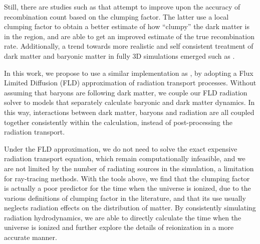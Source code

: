 Still, there are studies such as \citep{PawlikEtAl2009, RaicevicTheuns2011} 
that attempt to improve upon the accuracy of recombination count based on the clumping
factor.  The latter use a local clumping factor to obtain a better estimate
of how ``clumpy'' the dark matter is in the region, and are able to
get an improved estimate of the true recombination rate.  Additionally, a trend towards
more realistic and self consistent treatment of dark matter and
baryonic matter in fully 3D simulations emerged such as \citep{PetkovaSpringel2011a, 
PetkovaSpringel2011b}. 


In this work, we propose to use a similar implementation as 
\citealt{PetkovaSpringel2011b}, by adopting a Flux Limited Diffusion
(FLD) approximation of radiation transport processes.  Without 
assuming that baryons are following dark matter, we couple our FLD
radiation solver to models that separately calculate baryonic and dark
matter dynamics.  In this way, interactions between dark matter,
baryons and radiation are all coupled together consistently
within the calculation, instead of post-processing the radiation transport.

Under the FLD approximation, we do not need to solve the exact
expensive radiation transport equation, which remain computationally
infeasible, and we are not limited by the number of radiating sources
in the simulation, a limitation for ray-tracing methods.  With the
tools above, we find that the clumping factor is actually a poor
predictor for the time when the universe is ionized, due to the various
definitions of clumping factor in the literature, and that its use
usually neglects radiation effects on the distribution of matter.  By
consistently simulating radiation hydrodynamics, we are able to
directly calculate the time when the universe is ionized and further
explore the details of reionization in a more accurate manner. 
